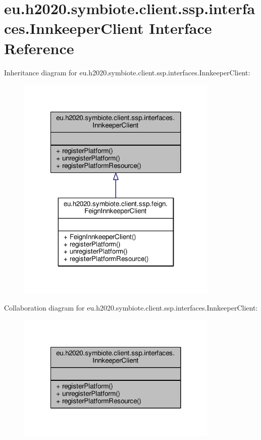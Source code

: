 \hypertarget{interfaceeu_1_1h2020_1_1symbiote_1_1client_1_1ssp_1_1interfaces_1_1InnkeeperClient}{}\section{eu.\+h2020.\+symbiote.\+client.\+ssp.\+interfaces.\+Innkeeper\+Client Interface Reference}
\label{interfaceeu_1_1h2020_1_1symbiote_1_1client_1_1ssp_1_1interfaces_1_1InnkeeperClient}


Inheritance diagram for eu.\+h2020.\+symbiote.\+client.\+ssp.\+interfaces.\+Innkeeper\+Client\+:
\nopagebreak
\begin{figure}[H]
\begin{center}
\leavevmode
\includegraphics[width=272pt]{interfaceeu_1_1h2020_1_1symbiote_1_1client_1_1ssp_1_1interfaces_1_1InnkeeperClient__inherit__graph}
\end{center}
\end{figure}


Collaboration diagram for eu.\+h2020.\+symbiote.\+client.\+ssp.\+interfaces.\+Innkeeper\+Client\+:
\nopagebreak
\begin{figure}[H]
\begin{center}
\leavevmode
\includegraphics[width=272pt]{interfaceeu_1_1h2020_1_1symbiote_1_1client_1_1ssp_1_1interfaces_1_1InnkeeperClient__coll__graph}
\end{center}
\end{figure}
